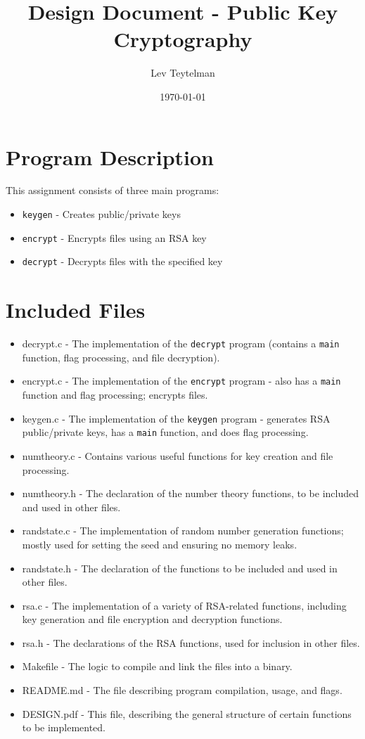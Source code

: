 \documentclass[12pt]{article}
\title{Design Document - Public Key Cryptography}
\author{Lev Teytelman}
\date{\today}
\begin{document}
\maketitle
\section{Program Description}

This assignment consists of three main programs:\begin{itemize}
    \item \verb|keygen| - Creates public/private keys
    \item \verb|encrypt| - Encrypts files using an RSA key
    \item \verb|decrypt| - Decrypts files with the specified key
\end{itemize}
\section{Included Files}

\begin{itemize}
    \item decrypt.c - The implementation of the \verb|decrypt| program (contains a \verb|main| function, flag processing, and file decryption).
    \item encrypt.c - The implementation of the \verb|encrypt| program - also has a \verb|main| function and flag processing; encrypts files.
    \item keygen.c - The implementation of the \verb|keygen| program - generates RSA public/private keys, has a \verb|main| function, and does flag processing.
    \item numtheory.c - Contains various useful functions for key creation and file processing.
    \item numtheory.h - The declaration of the number theory functions, to be included and used in other files.
    \item randstate.c - The implementation of random number generation functions; mostly used for setting the seed and ensuring no memory leaks.
    \item randstate.h - The declaration of the functions to be included and used in other files.
    \item rsa.c - The implementation of a variety of RSA-related functions, including key generation and file encryption and decryption functions.
    \item rsa.h - The declarations of the RSA functions, used for inclusion in other files.
    \item Makefile - The logic to compile and link the files into a binary.
    \item README.md - The file describing program compilation, usage, and flags.
    \item DESIGN.pdf - This file, describing the general structure of certain functions to be implemented.
\end{itemize}
\end{document}
